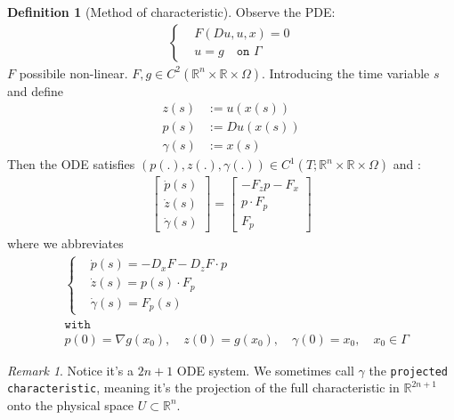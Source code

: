 \documentclass[a4paper,11pt,oneside,fleqn]{book}
\theoremstyle{definition}
\newtheorem{definition}{Definition}[section]
\theoremstyle{remark}
\newtheorem*{remark}{Remark}
\begin{document}
\begin{definition}[Method of characteristic]
Observe the PDE:
\begin{align*}
	\left\{
	\begin{aligned}
		&F(Du, u, x) = 0\\
		&u = g \quad \texttt{on } \Gamma
	\end{aligned}
	\right.
\end{align*}
$F$ possibile non-linear. $F, g \in C^2(\mathbb{R}^n \times \mathbb{R} \times \Omega)$. Introducing the time variable $s$ and define
	\begin{align*}
		z(s) &:= u(x(s))\\
		p(s) &:= Du(x(s))\\
		\gamma(s) &:= x(s)
	\end{align*}
Then the ODE satisfies $ (p(.), z(.), \gamma(.)) \in C^1(T; \mathbb{R}^n \times \mathbb{R} \times \Omega)$ and :
	\begin{align*}
		\begin{bmatrix}
			\dot{p}(s)\\
			\dot{z}(s)\\
			\dot{\gamma}(s)
		\end{bmatrix}
	= 
		\begin{bmatrix}
			- F_z p - F_x \\
			p \cdot F_p\\
			F_p
		\end{bmatrix}
	\end{align*}
	where we abbreviates 
	\begin{align*}
		&\left\{
	\begin{aligned}
		&\dot{p}(s) =-D_x F - D_z F \cdot p \\
		&\dot{z}(s) = p(s) \cdot F_p\\
		&\dot{\gamma}(s) = F_p(s)
	\end{aligned}
	\right.\\
	&\texttt{with}\\
	&p(0) = \nabla g(x_0), \quad z(0) = g(x_0), \quad \gamma(0) = x_0, \quad x_0 \in \Gamma
	\end{align*}
\end{definition}
\begin{remark}
Notice it's a $2n + 1$ ODE system. We sometimes call $\gamma$ the \texttt{projected characteristic}, meaning it's the projection of the full characteristic in $\mathbb{R}^{2n + 1}$ onto the physical space  $U \subset \mathbb{R}^n$.
\end{remark}
\end{document}
